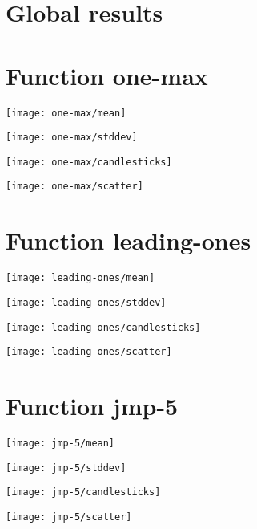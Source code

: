 \graphicspath{{../graphics/}}
\section{Global results}
\begin{center}

\end{center}
\newpage
\section{Function one-max}
\begin{center}

\end{center}
\begin{center}
\texttt{[image: one-max/mean]}
\end{center}
\begin{center}
\texttt{[image: one-max/stddev]}
\end{center}
\begin{center}
\texttt{[image: one-max/candlesticks]}
\end{center}
\begin{center}
\texttt{[image: one-max/scatter]}
\end{center}
\newpage
\section{Function leading-ones}
\begin{center}

\end{center}
\begin{center}
\texttt{[image: leading-ones/mean]}
\end{center}
\begin{center}
\texttt{[image: leading-ones/stddev]}
\end{center}
\begin{center}
\texttt{[image: leading-ones/candlesticks]}
\end{center}
\begin{center}
\texttt{[image: leading-ones/scatter]}
\end{center}
\newpage
\section{Function jmp-5}
\begin{center}

\end{center}
\begin{center}
\texttt{[image: jmp-5/mean]}
\end{center}
\begin{center}
\texttt{[image: jmp-5/stddev]}
\end{center}
\begin{center}
\texttt{[image: jmp-5/candlesticks]}
\end{center}
\begin{center}
\texttt{[image: jmp-5/scatter]}
\end{center}
\newpage

